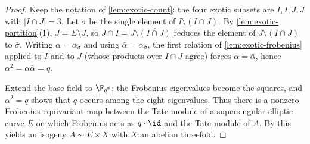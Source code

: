\begin{proof}
  Keep the notation of \cref{lem:exotic-count}: the four exotic subsets are
  \(I, \bar I, J, \bar J\) with \(|I \cap J| = 3\). Let \(\sigma\) be the single
  element of \(I \setminus (I \cap J)\). By \cref{lem:exotic-partition}(1),
  \(\bar J = \Sigma \setminus J\), so \(J \cap \bar I = \bar J \setminus
  \overline{(I \cap J)}\) reduces the element of \(J \setminus (I \cap J)\) to
  \(\bar\sigma\). Writing \(\alpha = \alpha_\sigma\) and using
  \(\bar\alpha = \alpha_{\bar\sigma}\), the first relation of
  \cref{lem:exotic-frobenius} applied to \(I\) and to \(J\) (whose products over
  \(I \cap J\) agree) forces \(\alpha = \bar\alpha\), hence
  \(\alpha^2 = \alpha \bar\alpha = q\).

  Extend the base field to \(\F_{q^2}\); the Frobenius eigenvalues become the
  squares, and \(\alpha^2 = q\) shows that \(q\) occurs among the eight
  eigenvalues. Thus there is a nonzero Frobenius-equivariant map between the
  Tate module of a supersingular elliptic curve \(E\) on which Frobenius acts as
  \(q \cdot \id\) and the Tate module of \(A\). By \cite[Theorem 4]{Tate} this
  yields an isogeny \(A \sim E \times X\) with \(X\) an abelian threefold.
\end{proof}

